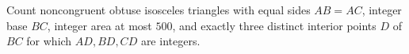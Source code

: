 Count noncongruent obtuse isosceles triangles with equal sides $AB=AC$, integer base $BC$, integer area at most $500$, and exactly three distinct interior points $D$ of $BC$ for which $AD,BD,CD$ are integers.

